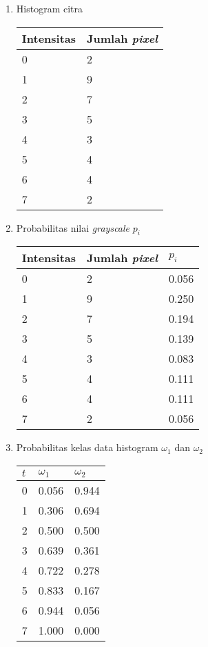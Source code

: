 \documentclass[laporan.tex]{subfiles}
\begin{document}
\begin{enumerate}

\item Histogram citra \\
\begin{tabular}{|l|l|}
\hline
Intensitas & Jumlah \emph{pixel} \\
\hline
0 & 2 \\
1 & 9 \\
2 & 7 \\
3 & 5 \\
4 & 3 \\
5 & 4 \\
6 & 4 \\
7 & 2 \\
\hline
\end{tabular}

\item Probabilitas nilai \emph{grayscale} $p_i$ \\
\begin{tabular}{|l|l|l|}
\hline
Intensitas & Jumlah \emph{pixel} & $p_i$ \\
\hline
0 & 2 & 0.056 \\
1 & 9 & 0.250 \\
2 & 7 & 0.194 \\
3 & 5 & 0.139 \\
4 & 3 & 0.083 \\
5 & 4 & 0.111 \\
6 & 4 & 0.111 \\
7 & 2 & 0.056 \\
\hline
\end{tabular}

\item Probabilitas kelas data histogram $\omega_1$ dan $\omega_2$ \\
\begin{tabular}{|l|l|l|}
\hline
$t$ & $\omega_1$ & $\omega_2$ \\
\hline
0 &  0.056 & 0.944 \\
1 &  0.306 & 0.694 \\
2 &  0.500 & 0.500 \\
3 &  0.639 & 0.361 \\
4 &  0.722 & 0.278 \\
5 &  0.833 & 0.167 \\
6 &  0.944 & 0.056 \\
7 &  1.000 & 0.000 \\
\hline
\end{tabular}


\end{enumerate}
\end{document}
